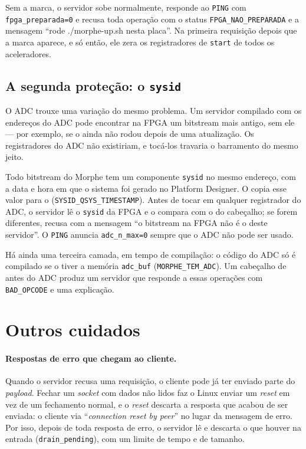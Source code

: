 Sem a marca, o servidor sobe normalmente, responde ao \texttt{PING} com
\texttt{fpga\_preparada=0} e recusa toda operação com o status
\texttt{FPGA\_NAO\_PREPARADA} e a mensagem ``rode ./morphe-up.sh nesta placa''.
Na primeira requisição depois que a marca aparece, e só então, ele zera os
registradores de \texttt{start} de todos os aceleradores.

\subsection*{A segunda proteção: o \texttt{sysid}}

O ADC trouxe uma variação do mesmo problema. Um servidor compilado com os
endereços do ADC pode encontrar na FPGA um bitstream mais antigo, sem ele ---
por exemplo, se o  ainda não rodou depois de uma atualização.
Os registradores do ADC não existiriam, e tocá-los travaria o barramento do
mesmo jeito.

Todo bitstream do Morphe tem um componente \texttt{sysid} no mesmo endereço,
com a data e hora em que o sistema foi gerado no Platform Designer. O
 copia esse valor para o 
(\texttt{SYSID\_QSYS\_TIMESTAMP}). Antes de tocar em qualquer registrador do
ADC, o servidor lê o \texttt{sysid} da FPGA e o compara com o do cabeçalho; se
forem diferentes, recusa com a mensagem ``o bitstream na FPGA não é o deste
servidor''. O \texttt{PING} anuncia \texttt{adc\_n\_max=0} sempre que o ADC não
pode ser usado.

Há ainda uma terceira camada, em tempo de compilação: o código do ADC só é
compilado se o  tiver a memória \texttt{adc\_buf}
(\texttt{MORPHE\_TEM\_ADC}). Um cabeçalho de antes do ADC produz um servidor que
responde a essas operações com \texttt{BAD\_OPCODE} e uma explicação.

\section{Outros cuidados}

\paragraph{Respostas de erro que chegam ao cliente.} Quando o servidor recusa
uma requisição, o cliente pode já ter enviado parte do \emph{payload}. Fechar um
\emph{socket} com dados não lidos faz o Linux enviar um \emph{reset} em vez de
um fechamento normal, e o \emph{reset} descarta a resposta que acabou de ser
enviada: o cliente via ``\emph{connection reset by peer}'' no lugar da mensagem
de erro. Por isso, depois de toda resposta de erro, o servidor lê e descarta o
que houver na entrada (\texttt{drain\_pending}), com um limite de tempo e de
tamanho.

